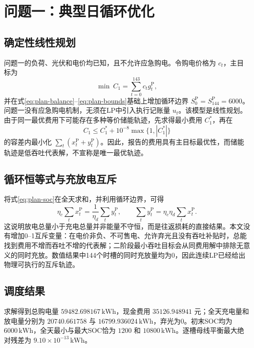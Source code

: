 \section{问题一：典型日循环优化}

\subsection{确定性线性规划}

问题一的负荷、光伏和电价均已知，且不允许应急购电。令购电价格为 $c_t$，主目标为
\begin{equation}
 \min\ C_1=\sum_{t=0}^{143}c_tg_t^{\mathrm P},
 \label{eq:q1objective}
\end{equation}
并在式\eqref{eq:plan-balance}--\eqref{eq:plan-bounds}基础上增加循环边界 $S_0^{\mathrm P}=S_{144}^{\mathrm P}=6000$。问题一没有应急购电机制，无须在LP中引入执行记账量 $u_t$。该模型是线性规划。由于同一最优费用下可能存在多种等价储能轨迹，先求得最小费用 $C_1^*$，再在
\begin{equation}
 C_1\le C_1^*+10^{-8}\max\{1,|C_1^*|\}
 \label{eq:q1tol}
\end{equation}
的容差内最小化 $\sum_t(x_t^{\mathrm P}+y_t^{\mathrm P})$。因此，报告的费用具有主目标最优性，而储能轨迹是低吞吐代表解，不宣称是唯一最优轨迹。

\subsection{循环恒等式与充放电互斥}
\label{sec:q1-mutual-exclusion}

将式\eqref{eq:plan-soc}在全天求和，并利用循环边界，可得
\begin{equation}
 \eta_c\sum_t x_t^{\mathrm P}=\frac{1}{\eta_d}\sum_t y_t^{\mathrm P},
 \qquad
 \sum_t y_t^{\mathrm P}=\eta_c\eta_d\sum_t x_t^{\mathrm P}.
 \label{eq:q1-cycle-identity}
\end{equation}
这说明放电总量小于充电总量并非能量不守恒，而是往返损耗的直接结果。本文没有增加0--1互斥变量：在电价非负、不可售电、允许弃光且没有吞吐补贴时，总能找到费用不增而吞吐不增的代表解；二阶段最小吞吐目标会从同费用解中排除无意义的同时充放。数值结果中144个时槽的同时充放量均为0，因此连续LP已经给出物理可执行的互斥轨迹。

\subsection{调度结果}

求解得到总购电量 $59482.698167\,\mathrm{kWh}$，现金费用 $35126.948941$ 元；全天充电量和放电量分别为 $20740.661758$ 与 $16799.936024\,\mathrm{kWh}$，弃光为0。初末SOC均为 $6000\,\mathrm{kWh}$，全天最小与最大SOC恰为 $1200$ 和 $10800\,\mathrm{kWh}$。逐槽母线平衡最大绝对残差为 $9.10\times10^{-13}\,\mathrm{kWh}$。

